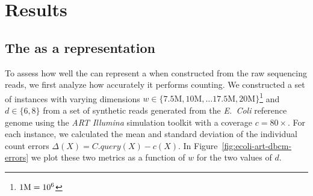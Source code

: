 \chapter{Results}

\section{The \dBCM as a \dBG representation}

To assess how well the \dBCM can represent a \dBG when constructed from the raw sequencing reads, we first analyze how accurately it performs \kmer counting. We constructed a set of \dBCM instances with varying dimensions $w \in \{7.5\text{M}, 10\text{M}, \ldots 17.5\text{M}, 20\text{M}\}$\footnote{$1\mega = 10^6$} and $d \in \{6, 8\}$ from a set of synthetic reads generated from the \emph{E.~Coli} reference genome \cite{ecoligenome} using the \emph{ART Illumina} simulation toolkit \cite{Huang2011} with a coverage $c=80\times$. For each instance, we calculated the mean and standard deviation of the individual count errors $\Delta(X) = C.\mathit{query}(X) - c(X)$. In Figure~\ref{fig:ecoli-art-dbcm-errors} we plot these two metrics as a function of $w$ for the two values of $d$.

